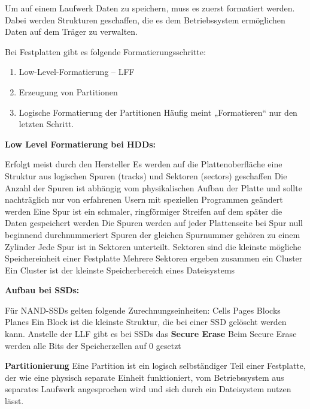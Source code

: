 \documentclass[asp1.tex]{subfiles}
\begin{document}
Um auf einem Laufwerk Daten zu speichern, muss es zuerst formatiert werden. Dabei werden Strukturen geschaffen, die es dem Betriebssystem ermöglichen Daten auf dem Träger zu verwalten.

Bei Festplatten gibt es folgende Formatierungsschritte:
\begin{enumerate}
    \item Low-Level-Formatierung – LFF
    \item Erzeugung von Partitionen
    \item Logische Formatierung der Partitionen
          Häufig meint „Formatieren“ nur den letzten Schritt.
\end{enumerate}


\textbf{Low Level Formatierung bei HDDs:}
\begin{outline}
    \1 Erfolgt meist durch den Hersteller
    \1 Es werden auf die Plattenoberfläche eine Struktur aus logischen Spuren (tracks) und Sektoren (sectors) geschaffen
    \1 Die Anzahl der Spuren ist abhängig vom physikalischen Aufbau der Platte und sollte nachträglich nur von erfahrenen Usern mit speziellen Programmen geändert werden
    \1 Eine Spur ist ein schmaler, ringförmiger Streifen auf dem später die Daten gespeichert werden
    \1 Die Spuren werden auf jeder Plattenseite bei Spur null beginnend durchnummeriert
    \1 Spuren der gleichen Spurnummer gehören zu einem Zylinder
    \1 Jede Spur ist in Sektoren unterteilt. Sektoren sind die kleinste mögliche Speichereinheit einer Festplatte
    \1 Mehrere Sektoren ergeben zusammen ein Cluster
    \1 Ein Cluster ist der kleinste Speicherbereich eines Dateisystems
\end{outline}

\textbf{Aufbau bei SSDs:}
\begin{outline}
    \1 Für NAND-SSDs gelten folgende Zurechnungseinheiten:
    \2 Cells \textrightarrow\space Pages \textrightarrow\space Blocks \textrightarrow\space Planes
    \1 Ein Block ist die kleinste Struktur, die bei einer SSD gelöscht werden kann.
    \1 Anstelle der LLF gibt es bei SSDs das \textbf{Secure Erase}
    \1 Beim Secure Erase werden alle Bits der Speicherzellen auf 0 gesetzt
\end{outline}


\textbf{Partitionierung}
Eine Partition ist ein logisch selbständiger Teil einer Festplatte, der wie eine physisch separate Einheit funktioniert, vom Betriebssystem aus separates Laufwerk angesprochen wird und sich durch ein Dateisystem nutzen lässt.
\end{document}
